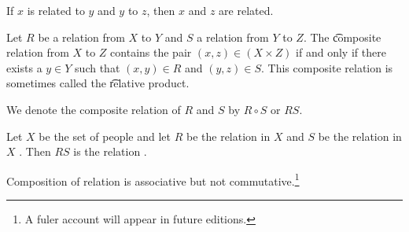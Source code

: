 

If $x$ is related to $y$ and $y$ to $z$, then $x$ and $z$ are related.


Let $R$ be a relation from $X$ to $Y$ and $S$ a relation from $Y$ to $Z$.
The \t{composite relation} from $X$ to $Z$ contains the pair $(x, z) \in (X \times Z)$ if and only if there exists a $y \in Y$ such that $(x, y) \in R$ and $(y,z) \in S$.
This composite relation is sometimes called the \t{relative product}.


We denote the composite relation of $R$ and $S$ by $R \circ S$ or $RS$.


Let $X$ be the set of people and let $R$ be the relation in $X$  and $S$ be the relation in $X$ .
Then $RS$ is the relation .


Composition of relation is associative but not commutative.\footnote{A fuler account will appear in future editions.}


\blankpage
